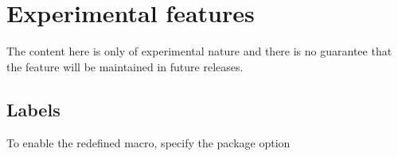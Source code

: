 \documentclass[12pt,a4paper,oneside]{article}
\begin{document}
\section{Experimental features}\label{subsec::associated_counters_experimental}


\begin{marker}
\marginnote{\bcbombe}
The content here is only of experimental nature and there is no guarantee that the feature will be maintained in future releases. 
\end{marker}


\subsection{Labels}



\begin{marker}
To enable the redefined  macro, specify the package option 
\end{marker}
\end{document}
